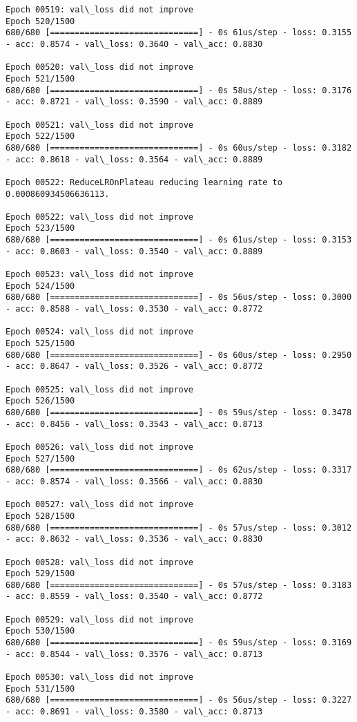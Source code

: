 \documentclass[11pt]{article}
\begin{document}
\begin{Verbatim}[commandchars=\\\{\}]
Epoch 00519: val\_loss did not improve
Epoch 520/1500
680/680 [==============================] - 0s 61us/step - loss: 0.3155 - acc: 0.8574 - val\_loss: 0.3640 - val\_acc: 0.8830

Epoch 00520: val\_loss did not improve
Epoch 521/1500
680/680 [==============================] - 0s 58us/step - loss: 0.3176 - acc: 0.8721 - val\_loss: 0.3590 - val\_acc: 0.8889

Epoch 00521: val\_loss did not improve
Epoch 522/1500
680/680 [==============================] - 0s 60us/step - loss: 0.3182 - acc: 0.8618 - val\_loss: 0.3564 - val\_acc: 0.8889

Epoch 00522: ReduceLROnPlateau reducing learning rate to 0.000860934506636113.

Epoch 00522: val\_loss did not improve
Epoch 523/1500
680/680 [==============================] - 0s 61us/step - loss: 0.3153 - acc: 0.8603 - val\_loss: 0.3540 - val\_acc: 0.8889

Epoch 00523: val\_loss did not improve
Epoch 524/1500
680/680 [==============================] - 0s 56us/step - loss: 0.3000 - acc: 0.8588 - val\_loss: 0.3530 - val\_acc: 0.8772

Epoch 00524: val\_loss did not improve
Epoch 525/1500
680/680 [==============================] - 0s 60us/step - loss: 0.2950 - acc: 0.8647 - val\_loss: 0.3526 - val\_acc: 0.8772

Epoch 00525: val\_loss did not improve
Epoch 526/1500
680/680 [==============================] - 0s 59us/step - loss: 0.3478 - acc: 0.8456 - val\_loss: 0.3543 - val\_acc: 0.8713

Epoch 00526: val\_loss did not improve
Epoch 527/1500
680/680 [==============================] - 0s 62us/step - loss: 0.3317 - acc: 0.8574 - val\_loss: 0.3566 - val\_acc: 0.8830

Epoch 00527: val\_loss did not improve
Epoch 528/1500
680/680 [==============================] - 0s 57us/step - loss: 0.3012 - acc: 0.8632 - val\_loss: 0.3536 - val\_acc: 0.8830

Epoch 00528: val\_loss did not improve
Epoch 529/1500
680/680 [==============================] - 0s 57us/step - loss: 0.3183 - acc: 0.8559 - val\_loss: 0.3540 - val\_acc: 0.8772

Epoch 00529: val\_loss did not improve
Epoch 530/1500
680/680 [==============================] - 0s 59us/step - loss: 0.3169 - acc: 0.8544 - val\_loss: 0.3576 - val\_acc: 0.8713

Epoch 00530: val\_loss did not improve
Epoch 531/1500
680/680 [==============================] - 0s 56us/step - loss: 0.3227 - acc: 0.8691 - val\_loss: 0.3580 - val\_acc: 0.8713


\end{Verbatim}
\end{document}
